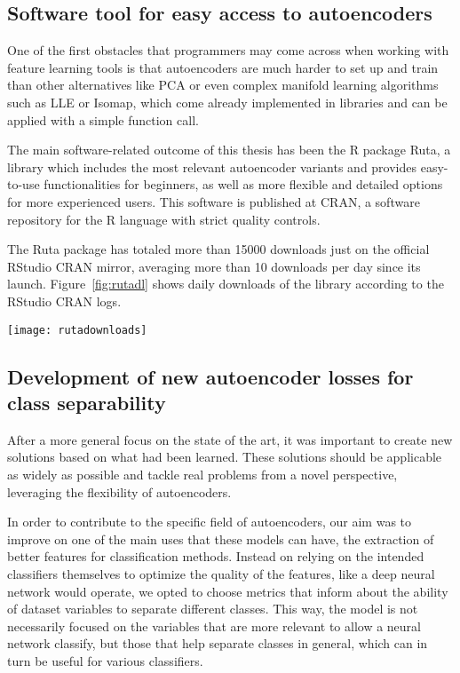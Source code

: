\subsection{Software tool for easy access to autoencoders}

One of the first obstacles that programmers may come across when working with feature learning tools is that autoencoders are much harder to set up and train than other alternatives like PCA or even complex manifold learning algorithms such as LLE or Isomap, which come already implemented in libraries and can be applied with a simple function call.

The main software-related outcome of this thesis has been the R package Ruta, a library which includes the most relevant autoencoder variants and provides easy-to-use functionalities for beginners, as well as more flexible and detailed options for more experienced users. This software is published at CRAN, a software repository for the R language with strict quality controls.

The Ruta package has totaled more than 15000 downloads just on the official RStudio CRAN mirror, averaging more than 10 downloads per day since its launch. Figure~\ref{fig:rutadl} shows daily downloads of the library according to the RStudio CRAN logs.

\begin{figure*}[htbp]
    \texttt{[image: rutadownloads]}
    \caption{\label{fig:rutadl}Per-day downloads of the Ruta package from the RStudio CRAN mirror.}
\end{figure*}

\subsection{Development of new autoencoder losses for class separability}

After a more general focus on the state of the art, it was important to create new solutions based on what had been learned. These solutions should be applicable as widely as possible and tackle real problems from a novel perspective, leveraging the flexibility of autoencoders.

In order to contribute to the specific field of autoencoders, our aim was to improve on one of the main uses that these models can have, the extraction of better features for classification methods. Instead on relying on the intended classifiers themselves to optimize the quality of the features, like a deep neural network would operate, we opted to choose metrics that inform about the ability of dataset variables to separate different classes. This way, the model is not necessarily focused on the variables that are more relevant to allow a neural network classify, but those that help separate classes in general, which can in turn be useful for various classifiers.

